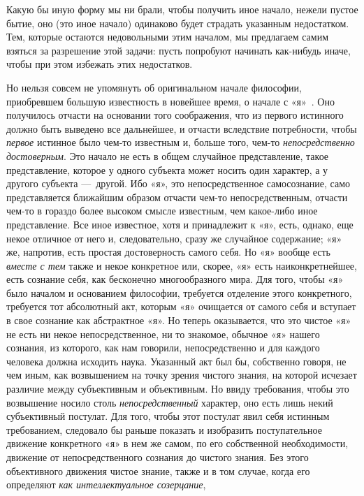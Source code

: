 Какую бы иную форму мы ни брали, чтобы получить иное начало, нежели
пустое бытие, оно (это иное начало) одинаково будет страдать указанным
недостатком. Тем, которые остаются недовольными этим началом, мы предлагаем
самим взяться за разрешение этой задачи: пусть попробуют начинать
как-нибудь иначе, чтобы при этом избежать этих недостатков.

Но нельзя совсем не упомянуть об оригинальном начале философии, приобревшем
большую известность в новейшее время, о начале с
«я»~.
Оно получилось отчасти на основании того соображения, что из первого
истинного должно быть выведено все дальнейшее, и отчасти вследствие
потребности, чтобы {\em первое} истинное было чем-то
известным и, больше того, чем-то {\em непосредственно
достоверным}. Это начало не есть в общем случайное представление, такое
представление, которое у одного субъекта может носить один характер, а у
другого субъекта —~другой. Ибо «я», это непосредственное самосознание, само
представляется ближайшим образом отчасти чем-то непосредственным, отчасти
чем-то в гораздо более высоком смысле известным, чем какое-либо иное
представление. Все иное известное, хотя и принадлежит к «я», есть,
однако, еще некое отличное от него и, следовательно, сразу же случайное
содержание; «я» же, напротив, есть простая достоверность самого себя. Но
«я» вообще есть {\em вместе с тем} также и некое
конкретное или, скорее, «я» есть наиконкретнейшее, есть сознание себя, как
бесконечно многообразного мира. Для того, чтобы «я» было началом и
основанием философии, требуется отделение этого конкретного, требуется тот
абсолютный акт, которым «я» очищается от самого себя и вступает в свое
сознание как абстрактное «я». Но теперь оказывается, что это чистое «я» не
есть ни некое непосредственное, ни то знакомое, обычное «я» нашего
сознания, из которого, как нам говорили, непосредственно и для каждого
человека должна исходить наука. Указанный акт был бы, собственно говоря, не
чем иным, как возвышением на точку зрения чистого знания, на которой
исчезает различие между субъективным и объективным. Но ввиду требования,
чтобы это возвышение носило столь
{\em непосредственный} характер, оно есть лишь некий
субъективный постулат. Для того, чтобы этот постулат явил себя истинным
требованием, следовало бы раньше показать и изобразить поступательное
движение конкретного «я» в нем же самом, по его собственной необходимости,
движение от непосредственного сознания до чистого знания. Без этого
объективного движения чистое знание, также и в том случае, когда его
определяют {\em как интеллектуальное созерцание},
